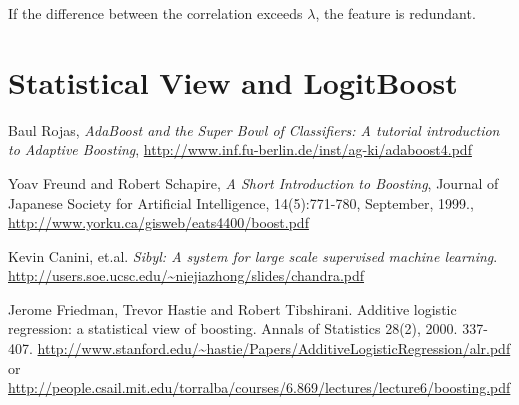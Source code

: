 \documentclass[]{article}  %
\begin{document}
If the difference between the correlation exceeds $\lambda$, the feature is redundant. 

\section{Statistical View and LogitBoost}




\begin{thebibliography}{9}

 Baul Rojas, \emph{AdaBoost and the Super Bowl of Classifiers: A tutorial introduction to Adaptive Boosting}, \url{http://www.inf.fu-berlin.de/inst/ag-ki/adaboost4.pdf}

 Yoav Freund and Robert Schapire, \emph{A Short Introduction to Boosting}, Journal of Japanese Society for Artificial Intelligence, 14(5):771-780, September, 1999., \url{http://www.yorku.ca/gisweb/eats4400/boost.pdf}

 Kevin Canini, et.al. \emph{Sibyl: A system for large scale supervised 
machine learning}. \url{http://users.soe.ucsc.edu/~niejiazhong/slides/chandra.pdf}

 Jerome Friedman, Trevor Hastie and Robert Tibshirani. Additive logistic regression: a statistical view of boosting. Annals of Statistics 28(2), 2000. 337-407. \url{http://www.stanford.edu/~hastie/Papers/AdditiveLogisticRegression/alr.pdf} or \url{http://people.csail.mit.edu/torralba/courses/6.869/lectures/lecture6/boosting.pdf}
\end{thebibliography}
\end{document}
